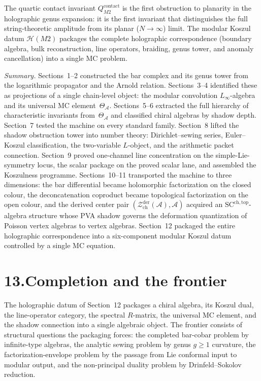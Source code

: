 \documentclass[11pt]{report}
\theoremstyle{definition}
\theoremstyle{remark}
\providecommand{\cA}{\mathcal{A}}
\providecommand{\cZ}{\mathcal{Z}}
\providecommand{\SCchtop}{\mathrm{SC}^{\mathrm{ch,top}}}
\numberwithin{equation}{section}
\begin{document}
The quartic contact invariant $Q^{\mathrm{contact}}_{M2}$
is the first obstruction to planarity in the holographic genus
expansion: it is the first invariant that distinguishes the
full string-theoretic amplitude from its planar ($N\to\infty$)
limit. The modular Koszul datum $\mathcal H(M2)$ packages the
complete holographic correspondence (boundary algebra, bulk
reconstruction, line operators, braiding, genus tower, and
anomaly cancellation) into a single MC problem.

\bigskip
\noindent
\emph{Summary.}\enspace
Sections~1--2 constructed the bar complex and its genus tower from
the logarithmic propagator and the Arnold relation.
Sections~3--4 identified these as projections of a single chain-level
object: the modular convolution $L_\infty$-algebra and its
universal MC element~$\Theta_\cA$.
Sections~5--6 extracted the full hierarchy of characteristic
invariants from~$\Theta_\cA$ and classified chiral algebras by
shadow depth.
Section~7 tested the machine on every standard family.
Section~8 lifted the shadow obstruction tower into number theory: Dirichlet--sewing
series, Euler--Koszul classification, the two-variable $L$-object, and
the arithmetic packet connection.
Section~9 proved one-channel line concentration on the
simple-Lie-symmetry locus, the scalar package on the proved scalar
lane, and assembled the Koszulness programme.
Sections~10--11 transported the machine to three dimensions:
the bar differential became holomorphic factorization on the closed
colour, the deconcatenation coproduct became topological factorization
on the open colour, and the derived center pair
$(\cZ^{\mathrm{der}}_{\mathrm{ch}}(\cA), \cA)$ acquired an
$\SCchtop$-algebra structure whose PVA shadow governs the deformation
quantization of Poisson vertex algebras to vertex algebras.
Section~12 packaged the entire holographic correspondence into a
six-component modular Koszul datum controlled by a single MC equation.


\section*{13.\quad Completion and the frontier}

The holographic datum of Section~12 packages a chiral algebra, its Koszul dual, the line-operator
category, the spectral $R$-matrix, the universal MC element, and
the shadow connection into a single algebraic object. The
frontier consists of structural questions the packaging
forces: the completed bar-cobar problem
by infinite-type algebras, the analytic sewing problem
by genus $g \ge 1$ curvature, the factorization-envelope
problem by the passage from Lie conformal input to
modular output, and the non-principal duality problem
by Drinfeld--Sokolov reduction.
\end{document}
